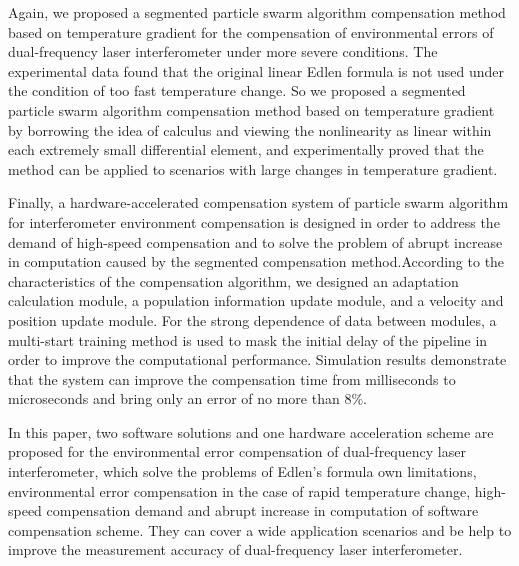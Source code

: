 \begin{abstract*}
  Again, we proposed a segmented particle swarm algorithm compensation method based on temperature gradient for the compensation of environmental errors of dual-frequency laser interferometer under more severe conditions. The experimental data found that the original linear Edlen formula is not used under the condition of too fast temperature change. So we proposed a segmented particle swarm algorithm compensation method based on temperature gradient by borrowing the idea of calculus and viewing the nonlinearity as linear within each extremely small differential element, and experimentally proved that the method can be applied to scenarios with large changes in temperature gradient.

  Finally, a hardware-accelerated compensation system of particle swarm algorithm for interferometer environment compensation is designed in order to address the demand of high-speed compensation and to solve the problem of abrupt increase in computation caused by the segmented compensation method.According to the characteristics of the compensation algorithm, we designed an adaptation calculation module, a population information update module, and a velocity and position update module. For the strong dependence of data between modules, a multi-start training method is used to mask the initial delay of the pipeline in order to improve the computational performance. Simulation results demonstrate that the system can improve the compensation time from milliseconds to microseconds and bring only an error of no more than $8\%$.

  In this paper, two software solutions and one hardware acceleration scheme are proposed for the environmental error compensation of dual-frequency laser interferometer, which solve the problems of Edlen's formula own limitations, environmental error compensation in the case of rapid temperature change, high-speed compensation demand and abrupt increase in computation of software compensation scheme. They can cover a wide application scenarios and be help to improve the measurement accuracy of dual-frequency laser interferometer.
\end{abstract*}

